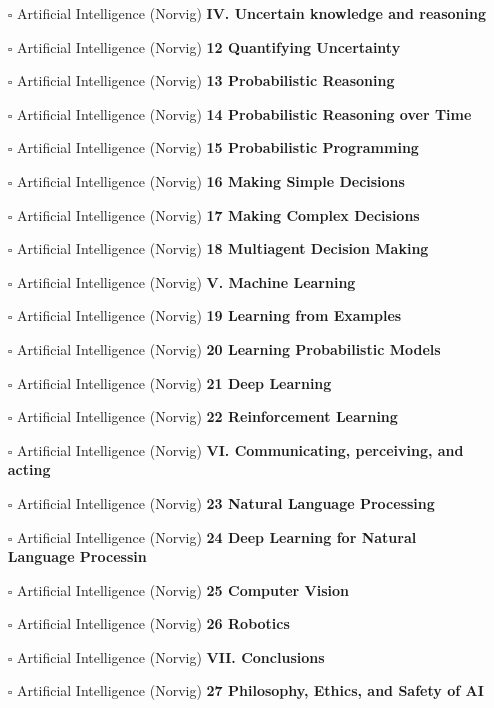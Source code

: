 \documentclass[a4, landscape, 12pt]{article}
\newcommand{\checkbox}{$\square$}%
\begin{document}
\begin{itemize}
\item [\checkbox]  Artificial Intelligence (Norvig) \textbf{ IV. Uncertain knowledge and reasoning
}
\item [\checkbox]  Artificial Intelligence (Norvig) \textbf{ 12 Quantifying Uncertainty
}
\item [\checkbox]  Artificial Intelligence (Norvig) \textbf{ 13 Probabilistic Reasoning
}
\item [\checkbox]  Artificial Intelligence (Norvig) \textbf{ 14 Probabilistic Reasoning over Time
}
\item [\checkbox]  Artificial Intelligence (Norvig) \textbf{ 15 Probabilistic Programming
}
\item [\checkbox]  Artificial Intelligence (Norvig) \textbf{ 16 Making Simple Decisions
}
\item [\checkbox]  Artificial Intelligence (Norvig) \textbf{ 17 Making Complex Decisions
}
\item [\checkbox]  Artificial Intelligence (Norvig) \textbf{ 18 Multiagent Decision Making
}
\item [\checkbox]  Artificial Intelligence (Norvig) \textbf{ V. Machine Learning
}
\item [\checkbox]  Artificial Intelligence (Norvig) \textbf{ 19 Learning from Examples
}
\item [\checkbox]  Artificial Intelligence (Norvig) \textbf{ 20 Learning Probabilistic Models
}
\item [\checkbox]  Artificial Intelligence (Norvig) \textbf{ 21 Deep Learning
}
\item [\checkbox]  Artificial Intelligence (Norvig) \textbf{ 22 Reinforcement Learning
}
\item [\checkbox]  Artificial Intelligence (Norvig) \textbf{ VI. Communicating, perceiving, and acting
}
\item [\checkbox]  Artificial Intelligence (Norvig) \textbf{ 23 Natural Language Processing
}
\item [\checkbox]  Artificial Intelligence (Norvig) \textbf{ 24 Deep Learning for Natural Language Processin
}
\item [\checkbox]  Artificial Intelligence (Norvig) \textbf{ 25 Computer Vision
}
\item [\checkbox]  Artificial Intelligence (Norvig) \textbf{ 26 Robotics
}
\item [\checkbox]  Artificial Intelligence (Norvig) \textbf{ VII. Conclusions
}
\item [\checkbox]  Artificial Intelligence (Norvig) \textbf{ 27 Philosophy, Ethics, and Safety of AI
}
\end{itemize}
\end{document}
